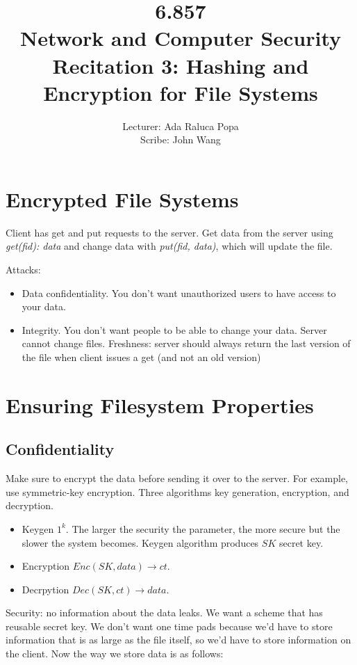 \documentclass[psamsfonts]{amsart}
\title{6.857 \\
Network and Computer Security \\
Recitation 3: Hashing and Encryption for File Systems}
\author{Lecturer: Ada Raluca Popa\\
Scribe: John Wang}
\begin{document}
\maketitle

\section{Encrypted File Systems}

Client has get and put requests to the server. Get data from the server using \emph{get(fid): data} and change data with \emph{put(fid, data)}, which will update the file.

Attacks:
\begin{itemize}
  \item Data confidentiality. You don't want unauthorized users to have access to your data.
  \item Integrity. You don't want people to be able to change your data. Server cannot change files. Freshness: server should always return the last version of the file when client issues a get (and not an old version)
\end{itemize}

\section{Ensuring Filesystem Properties}

\subsection{Confidentiality}

Make sure to encrypt the data before sending it over to the server. For example, use symmetric-key encryption. Three algorithms key generation, encryption, and decryption.

\begin{itemize}
  \item Keygen $\mathrm{1}^k$. The larger the security the parameter, the more secure but the slower the system becomes. Keygen algorithm produces $SK$ secret key.
  \item Encryption $Enc(SK, data) \rightarrow ct$.
  \item Decrpytion $Dec(SK, ct) \rightarrow data$.
\end{itemize}

Security: no information about the data leaks. We want a scheme that has reusable secret key. We don't want one time pads because we'd have to store information that is as large as the file itself, so we'd have to store information on the client. Now the way we store data is as follows:
\end{document}
